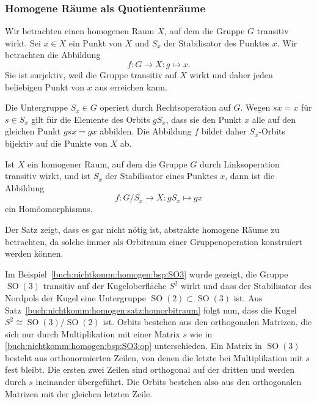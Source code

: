 %
%
\subsubsection{Homogene Räume als Quotientenräume}
Wir betrachten einen homogenen Raum $X$, auf dem die Gruppe $G$
transitiv wirkt.
Sei $x\in X$ ein Punkt von $X$ und $S_x$ der Stabilisator des
Punktes $x$.
Wir betrachten die Abbildung
\[
f
\colon
G\to X
:
g \mapsto x.
\]
Sie ist surjektiv, weil die Gruppe transitiv auf $X$ wirkt und
daher jeden beliebigen Punkt von $x$ aus erreichen kann.

Die Untergruppe $S_x\in G$ operiert durch Rechtsoperation auf $G$.
Wegen $sx=x$ für $s\in S_x$ gilt für die Elemente des Orbits
$gS_x$, dass sie den Punkt $x$ alle auf den gleichen Punkt
\(
gsx = gx
\)
abbilden.
Die Abbildung $f$ bildet daher $S_x$-Orbits bijektiv auf die
Punkte von $X$ ab.

\begin{satz}
\label{buch:nichtkomm:homogen:satz:homorbitraum}
Ist $X$ ein homogener Raum, auf dem die Gruppe $G$ durch Linksoperation
transitiv wirkt, und ist $S_x$ der Stabilisator eines Punktes $x$, dann
ist die Abbildung
\[
f
\colon
G/S_x \to  X
:
gS_x \mapsto gx
\]
ein Homöomorphismus.
\end{satz}

Der Satz zeigt, dass es gar nicht nötig ist, abstrakte homogene Räume
zu betrachten, da solche immer als Orbitraum einer Gruppenoperation 
konstruiert werden können.

\begin{beispiel}
\label{buch:nichtkomm:homogen:bsp:SO3/SO2}
Im Beispiel~\ref{buch:nichtkomm:homogen:bsp:SO3} wurde gezeigt,
die Gruppe $\operatorname{SO}(3)$ transitiv auf der Kugeloberfläche
$S^2$ wirkt und dass der Stabilisator des Nordpols der Kugel
eine Untergruppe $\operatorname{SO}(2)\subset\operatorname{SO}(3)$ ist.
Aus Satz~\ref{buch:nichtkomm:homogen:satz:homorbitraum} folgt nun,
dass die Kugel $S^2\cong \operatorname{SO}(3)/\operatorname{SO}(2)$
ist.
Orbits bestehen aus den orthogonalen Matrizen, die sich nur durch
Multiplikation mit einer Matrix $s$ wie in 
\eqref{buch:nichtkomm:homogen:bsp:SO3:op}
unterschieden.
Ein Matrix in $\operatorname{SO}(3)$ besteht aus orthonormierten 
Zeilen, von denen die letzte bei Multiplikation mit $s$ fest bleibt.
Die ersten zwei Zeilen sind orthogonal auf der dritten und werden durch
$s$ ineinander übergeführt.
Die Orbits bestehen also aus den orthogonalen Matrizen mit der gleichen
letzten Zeile.
\end{beispiel}

